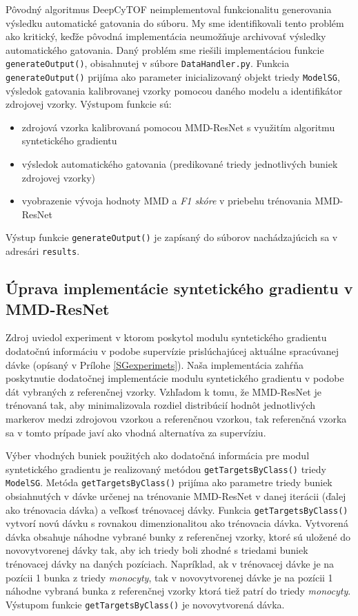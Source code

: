 Pôvodný algoritmus DeepCyTOF neimplementoval funkcionalitu generovania výsledku automatické gatovania do súboru. My sme identifikovali tento problém ako kritický, keďže pôvodná implementácia neumožňuje archivovať výsledky automatického gatovania. Daný problém sme riešili implementáciou funkcie \texttt{generateOutput()}, obisahnutej v súbore \texttt{DataHandler.py}. Funkcia \texttt{generateOutput()} prijíma ako parameter inicializovaný objekt triedy \texttt{ModelSG}, výsledok gatovania kalibrovanej vzorky pomocou daného modelu a identifikátor zdrojovej vzorky. Výstupom funkcie sú:
\begin{itemize}
    \item zdrojová vzorka kalibrovaná pomocou MMD-ResNet s využitím algoritmu syntetického gradientu
    \item výsledok automatického gatovania (predikované triedy jednotlivých buniek zdrojovej vzorky)
    \item vyobrazenie vývoja hodnoty MMD a \textit{F1 skóre} v priebehu trénovania MMD-ResNet
\end{itemize}
Výstup funkcie \texttt{generateOutput()} je zapísaný do súborov nachádzajúcich sa v adresári \texttt{results}.

\subsection{Úprava implementácie syntetického gradientu v MMD-ResNet}
\label{uprava_implementacie_ResNet}

Zdroj \cite{Jaderberg2016} uviedol experiment v ktorom poskytol modulu syntetického gradientu dodatočnú informáciu v podobe supervízie prislúchajúcej aktuálne spracúvanej dávke (opísaný v Prílohe \ref{SGexperimets}). Naša implementácia zahŕňa poskytnutie dodatočnej implementácie modulu syntetického gradientu v podobe dát vybraných z referenčnej vzorky. Vzhľadom k tomu, že MMD-ResNet je trénovaná tak, aby minimalizovala rozdiel distribúcií hodnôt jednotlivých markerov medzi zdrojovou vzorkou a referenčnou vzorkou, tak referenčná vzorka sa v tomto prípade javí ako vhodná alternatíva za supervíziu.

Výber vhodných buniek použitých ako dodatočná informácia pre modul syntetického gradientu je realizovaný metódou \texttt{getTargetsByClass()} triedy \texttt{ModelSG}. Metóda \texttt{getTargetsByClass()} prijíma ako parametre triedy buniek obsiahnutých v dávke určenej na trénovanie MMD-ResNet v danej iterácii (ďalej ako trénovacia dávka) a veľkosť trénovacej dávky. Funkcia \texttt{getTargetsByClass()} vytvorí novú dávku s rovnakou dimenzionalitou ako trénovacia dávka. Vytvorená dávka obsahuje náhodne vybrané bunky z referenčnej vzorky, ktoré sú uložené do novovytvorenej dávky tak, aby ich triedy boli zhodné s triedami buniek trénovacej dávky na daných pozíciach. Napríklad, ak v trénovacej dávke je na pozícii 1 bunka z triedy \textit{monocyty}, tak v novovytvorenej dávke je na pozícii 1 náhodne vybraná bunka z referenčnej vzorky ktorá tiež patrí do triedy \textit{monocyty}. Výstupom funkcie \texttt{getTargetsByClass()} je novovytvorená dávka.

